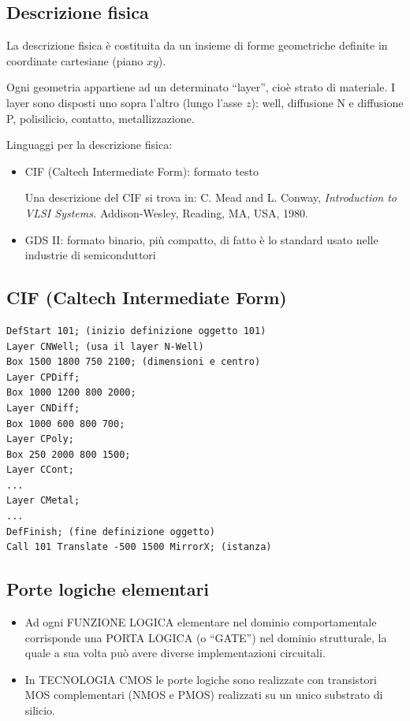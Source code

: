 \documentclass[10pt,a4paper,twoside,twocolumn]{article}
\begin{document}
\subsection{Descrizione fisica}
La descrizione fisica \`e costituita da un insieme di forme geometriche definite 
in coordinate cartesiane (piano $xy$).

Ogni geometria appartiene ad un determinato ``layer'', cio\`e strato di materiale.
I layer sono disposti uno sopra l'altro (lungo l'asse $z$):
well, diffusione N e diffusione P, polisilicio, contatto, metallizzazione.

\bigskip

Linguaggi per la descrizione fisica:
\begin{itemize}
\item
CIF (Caltech Intermediate Form): formato testo

{\footnotesize Una descrizione del CIF si trova in: C. Mead and L. Conway, 
\emph{Introduction to VLSI Systems.} Addison-Wesley, Reading, MA, USA, 1980.}

\item
GDS II: formato binario, pi\`u compatto, 
di fatto \`e lo standard usato nelle industrie di semiconduttori
\end{itemize}



\subsection{CIF (Caltech Intermediate Form)}
\vspace{-2mm}
\begin{verbatim}
DefStart 101; (inizio definizione oggetto 101)
Layer CNWell; (usa il layer N-Well)
Box 1500 1800 750 2100; (dimensioni e centro)
Layer CPDiff;
Box 1000 1200 800 2000;
Layer CNDiff;
Box 1000 600 800 700;
Layer CPoly;
Box 250 2000 800 1500;
Layer CCont;
...
Layer CMetal;
...
DefFinish; (fine definizione oggetto)
Call 101 Translate -500 1500 MirrorX; (istanza)
\end{verbatim}



\subsection{Porte logiche elementari}
\begin{itemize}
\item
Ad ogni FUNZIONE LOGICA elementare nel dominio
comportamentale corrisponde una PORTA LOGICA (o
``GATE'') nel dominio strutturale, la quale a sua volta pu\`o
avere diverse implementazioni circuitali.
\item
In TECNOLOGIA CMOS le porte logiche sono realizzate
con transistori MOS complementari (NMOS e PMOS)
realizzati su un unico substrato di silicio.
\end{itemize}
\end{document}
